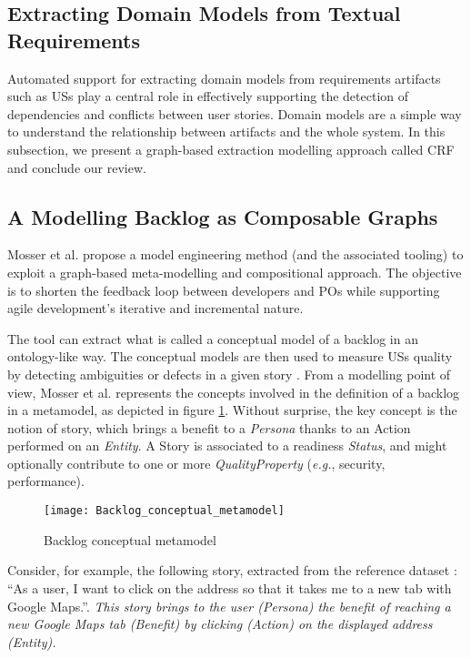 \subsection{Extracting Domain Models from Textual Requirements}\label{dmodel}
Automated support for extracting domain models from requirements artifacts such as USs play a central role in effectively supporting the detection of dependencies and conflicts between user stories. Domain models are a simple way to understand the relationship between artifacts and the whole system. In this subsection, we present a graph-based extraction modelling approach called CRF and conclude our review.
\subsection*{A Modelling Backlog as Composable Graphs} \label{composable_graph}
Mosser et al. propose a model engineering method (and the associated tooling) to exploit a graph-based meta-modelling and compositional approach. The objective is to shorten the feedback loop between developers and POs while supporting agile development’s iterative and incremental nature. 

The tool can extract what is called a conceptual model of a backlog in an ontology-like way. The conceptual models are then used to measure USs quality by detecting ambiguities or defects in a given story \cite{mosser2022modelling}.
From a modelling point of view, Mosser et al. represents the concepts involved in the deﬁnition of a backlog in a metamodel, as depicted in figure \ref{fig:conceptual_metamodel}. Without surprise, the key concept is the notion of story, which brings a benefit to a \emph{Persona} thanks to an Action performed on an \emph{Entity}. A Story is associated to a readiness \emph{Status}, and might optionally contribute to one or more \emph{QualityProperty} (\emph{e.g.}, security, performance).
\begin{figure}
\center
\texttt{[image: Backlog\_conceptual\_metamodel]}
\caption{Backlog conceptual metamodel \cite{mosser2022modelling}}\label{fig:conceptual_metamodel}
\end{figure}

Consider, for example, the following story, extracted from the reference dataset \cite{Dalpiaz2018}: \enquote{As a user, I want to click on the address so that it takes me to a new tab with Google Maps.}. \emph{This story brings to the user (Persona) the benefit of reaching a new Google Maps tab (Benefit) by clicking (Action) on the displayed address (Entity).}

